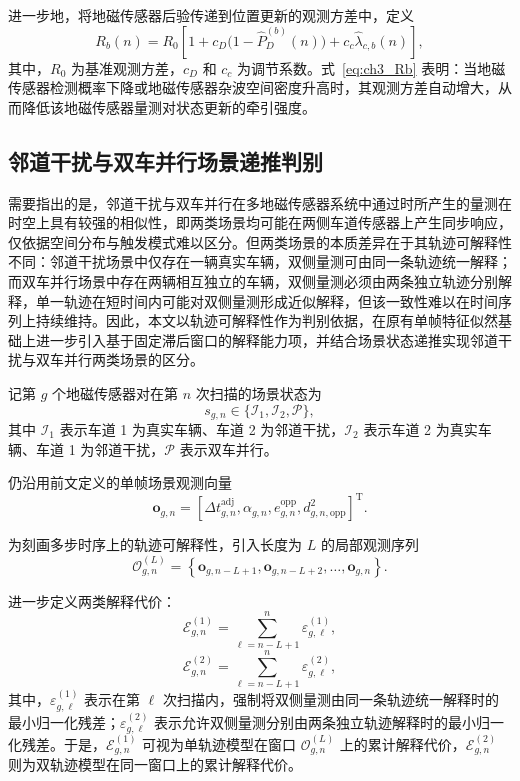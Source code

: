 \documentclass{xdupgthesis}
\begin{document}
进一步地，将地磁传感器后验传递到位置更新的观测方差中，定义
\begin{equation}
	R_b(n)=R_0\left[1+c_D\bigl(1-\hat P_D^{(b)}(n)\bigr)+c_c\hat\lambda_{c,b}(n)\right],
	\label{eq:ch3_Rb}
\end{equation}
其中，$R_0$ 为基准观测方差，$c_D$ 和 $c_c$ 为调节系数。式~\eqref{eq:ch3_Rb} 表明：当地磁传感器检测概率下降或地磁传感器杂波空间密度升高时，其观测方差自动增大，从而降低该地磁传感器量测对状态更新的牵引强度。

\subsection{邻道干扰与双车并行场景递推判别}

需要指出的是，邻道干扰与双车并行在多地磁传感器系统中通过时所产生的量测在时空上具有较强的相似性，即两类场景均可能在两侧车道传感器上产生同步响应，仅依据空间分布与触发模式难以区分。但两类场景的本质差异在于其轨迹可解释性不同：邻道干扰场景中仅存在一辆真实车辆，双侧量测可由同一条轨迹统一解释；而双车并行场景中存在两辆相互独立的车辆，双侧量测必须由两条独立轨迹分别解释，单一轨迹在短时间内可能对双侧量测形成近似解释，但该一致性难以在时间序列上持续维持。因此，本文以轨迹可解释性作为判别依据，在原有单帧特征似然基础上进一步引入基于固定滞后窗口的解释能力项，并结合场景状态递推实现邻道干扰与双车并行两类场景的区分。

记第 $g$ 个地磁传感器对在第 $n$ 次扫描的场景状态为
\begin{equation}
	s_{g,n}\in\{\mathcal I_1,\mathcal I_2,\mathcal P\},
\end{equation}
其中 $\mathcal I_1$ 表示车道 1 为真实车辆、车道 2 为邻道干扰，$\mathcal I_2$ 表示车道 2 为真实车辆、车道 1 为邻道干扰，$\mathcal P$ 表示双车并行。

仍沿用前文定义的单帧场景观测向量
\begin{equation}
	\mathbf o_{g,n}
	=
	\left[
	\Delta t_{g,n}^{\mathrm{adj}},
	\alpha_{g,n},
	e_{g,n}^{\mathrm{opp}},
	d_{g,n,\mathrm{opp}}^2
	\right]^{\mathrm T}.
\end{equation}

为刻画多步时序上的轨迹可解释性，引入长度为 $L$ 的局部观测序列
\begin{equation}
	\mathcal O_{g,n}^{(L)}
	=
	\left\{
	\mathbf o_{g,n-L+1},
	\mathbf o_{g,n-L+2},
	\ldots,
	\mathbf o_{g,n}
	\right\}.
\end{equation}

进一步定义两类解释代价：
\begin{equation}
	\mathcal E_{g,n}^{(1)}
	=
	\sum_{\ell=n-L+1}^{n}\varepsilon_{g,\ell}^{(1)},
\end{equation}
\begin{equation}
	\mathcal E_{g,n}^{(2)}
	=
	\sum_{\ell=n-L+1}^{n}\varepsilon_{g,\ell}^{(2)},
\end{equation}
其中，$\varepsilon_{g,\ell}^{(1)}$ 表示在第 $\ell$ 次扫描内，强制将双侧量测由同一条轨迹统一解释时的最小归一化残差；$\varepsilon_{g,\ell}^{(2)}$ 表示允许双侧量测分别由两条独立轨迹解释时的最小归一化残差。于是，$\mathcal E_{g,n}^{(1)}$ 可视为单轨迹模型在窗口 $\mathcal O_{g,n}^{(L)}$ 上的累计解释代价，$\mathcal E_{g,n}^{(2)}$ 则为双轨迹模型在同一窗口上的累计解释代价。
\end{document}

